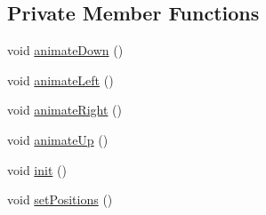 \subsection*{Private Member Functions}
\begin{DoxyCompactItemize}
\item 
void \hyperlink{classMenu_a1345c7f2d610b7289e385031ab153c2a}{animate\+Down} ()
\item 
void \hyperlink{classMenu_a68cde302725490afd9e28673a525b48a}{animate\+Left} ()
\item 
void \hyperlink{classMenu_a3d5dd5c71d3985c4744a9147f623e77b}{animate\+Right} ()
\item 
void \hyperlink{classMenu_ad35665dbb77f3cbb1aa5fcdcb92ce39b}{animate\+Up} ()
\item 
void \hyperlink{classMenu_a342d2a526a850dbf2d1aecd830b91287}{init} ()
\item 
void \hyperlink{classMenu_a5b7ec5defefb42f3636ed019e42fd278}{set\+Positions} ()
\end{DoxyCompactItemize}
